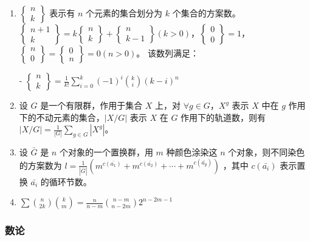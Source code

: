 \begin{enumerate}
\item $\begin{Bmatrix}n\\k\end{Bmatrix}$ 表示有 $n$ 个元素的集合划分为 $k$ 个集合的方案数。$\begin{Bmatrix}n+1\\k\end{Bmatrix}=k\begin{Bmatrix}n\\k\end{Bmatrix}+\begin{Bmatrix}n\\k-1\end{Bmatrix}(k>0)$，$\begin{Bmatrix}0\\0\end{Bmatrix}=1$，$\begin{Bmatrix}n\\0\end{Bmatrix}=\begin{Bmatrix}0\\n\end{Bmatrix}=0(n>0)$。
该数列满足：

- $\begin{Bmatrix}n\\k\end{Bmatrix}=\frac{1}{k!}\sum_{i=0}^{k}(-1)^{i}{k\choose i}(k-i)^{n}$

\item 设 $G$ 是一个有限群，作用于集合 $X$ 上，对 $\forall g\in G$，$X^{g}$ 表示 $X$ 中在 $g$ 作用下的不动元素的集合，$|X/G|$ 表示 $X$ 在 $G$ 作用下的轨道数，则有 $|X/G|=\frac{1}{|G|}\sum_{g\in G}|X^{g}|$。

\item 设 $\bar{G}$ 是 $n$ 个对象的一个置换群，用 $m$ 种颜色涂染这 $n$ 个对象，则不同染色的方案数为 $l=\frac{1}{|\bar{G}|}(m^{c(\bar{a_{1}})}+m^{c(\bar{a_{2}})}+\cdots+m^{c(\bar{a_{g}})})$ ，其中 $c(\bar{a_{i}})$ 表示置换 $\bar{a_{i}}$ 的循环节数。

\item $\sum{n\choose2k}{k\choose m}=\frac{n}{n-m}{n-m\choose n-2m}2^{n-2m-1}$

\end{enumerate}

\subsubsection{数论}

